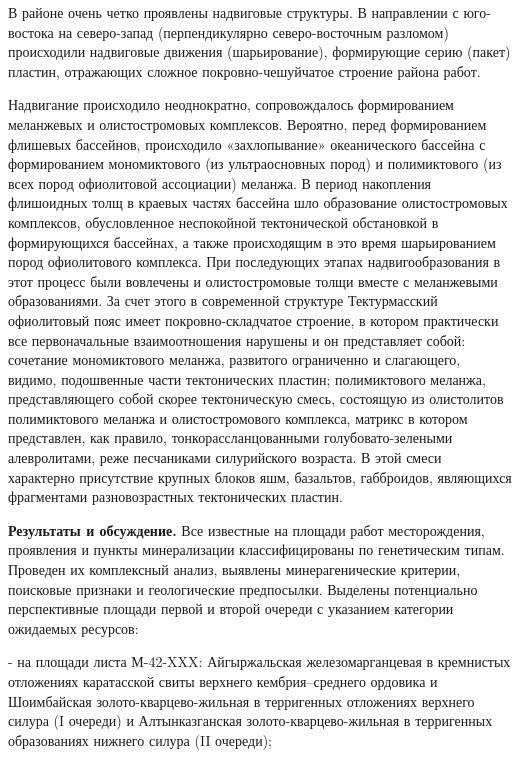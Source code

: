 \begin{multicols}{2}
В районе очень четко проявлены надвиговые структуры. В направлении с
юго-востока на северо-запад (перпендикулярно северо-восточным разломом)
происходили надвиговые движения (шарьирование), формирующие серию
(пакет) пластин, отражающих сложное покровно-чешуйчатое строение района
работ.

Надвигание происходило неоднократно, сопровождалось формированием
меланжевых и олистостромовых комплексов. Вероятно, перед формированием
флишевых бассейнов, происходило «захлопывание» океанического бассейна с
формированием мономиктового (из ультраосновных пород) и полимиктового
(из всех пород офиолитовой ассоциации) меланжа. В период накопления
флишоидных толщ в краевых частях бассейна шло образование
олистостромовых комплексов, обусловленное неспокойной тектонической
обстановкой в формирующихся бассейнах, а также происходящим в это время
шарьированием пород офиолитового комплекса. При последующих этапах
надвигообразования в этот процесс были вовлечены и олистостромовые толщи
вместе с меланжевыми образованиями. За счет этого в современной
структуре Тектурмасский офиолитовый пояс имеет покровно-складчатое
строение, в котором практически все первоначальные взаимоотношения
нарушены и он представляет собой: сочетание мономиктового меланжа,
развитого ограниченно и слагающего, видимо, подошвенные части
тектонических пластин; полимиктового меланжа, представляющего собой
скорее тектоническую смесь, состоящую из олистолитов полимиктового
меланжа и олистостромового комплекса, матрикс в котором представлен, как
правило, тонкорассланцованными голубовато-зелеными алевролитами, реже
песчаниками силурийского возраста. В этой смеси характерно присутствие
крупных блоков яшм, базальтов, габброидов, являющихся фрагментами
разновозрастных тектонических пластин.

{\bfseries Результаты и обсуждение.} Все известные на площади работ
месторождения, проявления и пункты минерализации классифицированы по
генетическим типам. Проведен их комплексный анализ, выявлены
минерагенические критерии, поисковые признаки и геологические
предпосылки. Выделены потенциально перспективные площади первой и второй
очереди с указанием категории ожидаемых ресурсов:

- на площади листа М-42-XXX: Айгыржальская железомарганцевая в
кремнистых отложениях каратасской свиты верхнего кембрия--среднего
ордовика и Шоимбайская золото-кварцево-жильная в терригенных отложениях
верхнего силура (I очереди) и Алтынказганская золото-кварцево-жильная в
терригенных образованиях нижнего силура (II очереди);


\end{multicols}
